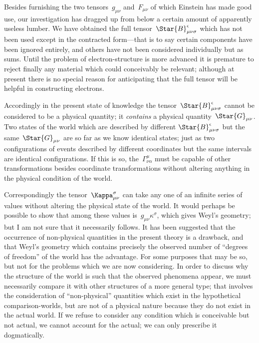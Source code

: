 \documentclass[12pt]{book}
\begin{document}
Besides furnishing the two tensors~$g_{\mu\nu}$ and~$F_{\mu\nu}$ of which Einstein has
made good use, our investigation has dragged up from below a certain
amount of apparently useless lumber. We have obtained the full tensor~$\Star{B}_{\mu\nu\sigma}^{\epsilon}$
which has not been used except in the contracted form---that is to say
certain components have been ignored entirely, and others have not been
considered individually but as sums. Until the problem of electron\hyp{}structure
is more advanced it is premature to reject finally any material which could
conceivably be relevant; although at present there is no special reason for
anticipating that the full tensor will be helpful in constructing electrons.

Accordingly in the present state of knowledge the tensor~$\Star{B}_{\mu\nu\sigma}^{\epsilon}$ cannot
be considered to be a physical quantity; it \emph{contains} a physical quantity~$\Star{G}_{\mu\nu}$.
Two states of the world which are described by different $\Star{B}_{\mu\nu\sigma}^{\epsilon}$ but the
same~$\Star{G}_{\mu\nu}$ are so far as we know identical states; just as two configurations
of events described by different coordinates but the same intervals are
identical configurations. If this is so, the~$\Gamma_{\nu\alpha}^{\mu}$ must be capable of other transformations
besides coordinate transformations without altering anything in
the physical condition of the world.

Correspondingly the tensor~$\Kappa_{\mu\nu}^{\sigma}$ can take any one of an infinite series of
values without altering the physical state of the world. It would perhaps be
possible to show that among these values is~$g_{\mu\nu} \kappa^{\sigma}$, which gives Weyl's geometry;
but I am not sure that it necessarily follows. It has been suggested
that the occurrence of non\hyp{}physical quantities in the present theory is a
drawback, and that Weyl's geometry which contains precisely the observed
number of ``degrees of freedom'' of the world has the advantage. For some
purposes that may be so, but not for the problems which we are now considering.
In order to discuss why the structure of the world is such that the
observed phenomena appear, we must necessarily compare it with other
structures of a more general type; that involves the consideration of ``non\hyp{}physical''
quantities which exist in the hypothetical comparison\hyp{}worlds, but
are not of a physical nature because they do not exist in the actual world.
If we refuse to consider any condition which is conceivable but not actual,
we cannot account for the actual; we can only prescribe it dogmatically.
\end{document}
